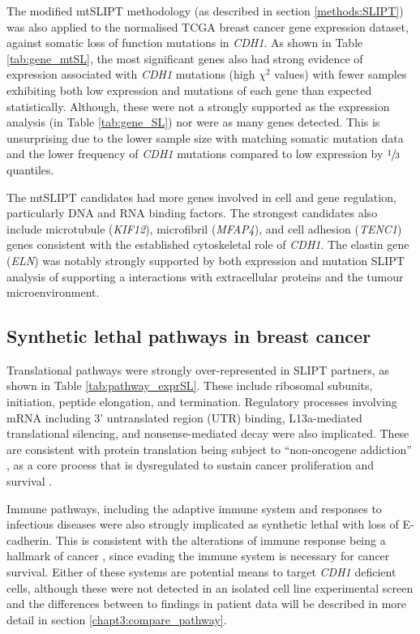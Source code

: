 The modified mtSLIPT methodology (as described in section \ref{methods:SLIPT}) was also applied to the normalised TCGA breast cancer gene expression dataset, against somatic loss of function mutations in \textit{CDH1}. As shown in Table \ref{tab:gene_mtSL}, the most significant genes also had strong evidence of expression associated with \textit{CDH1} mutations (high $\chi^2$ values) with fewer samples exhibiting both low expression and mutations of each gene than expected statistically. Although, these were not a strongly supported as the expression analysis (in Table \ref{tab:gene_SL}) nor were as many genes detected. This is unsurprising due to the lower sample size with matching somatic mutation data and the lower frequency of \textit{CDH1} mutations compared to low expression by $\sfrac{1}{3}$ quantiles.

The mtSLIPT candidates had more genes involved in cell and gene regulation, particularly DNA and RNA binding factors. The strongest candidates also include microtubule (\textit{KIF12}), microfibril (\textit{MFAP4}), and cell adhesion (\textit{TENC1}) genes consistent with the established cytoskeletal role of \textit{CDH1}. The elastin gene (\textit{ELN}) was notably strongly supported by both expression and mutation SLIPT analysis of  supporting a interactions with extracellular proteins and the tumour microenvironment.


\subsection{Synthetic lethal pathways in breast cancer} \label{chapt3:exprSL_pathways}

Translational pathways were strongly over-represented in SLIPT partners, as shown in Table \ref{tab:pathway_exprSL}. These include ribosomal subunits, initiation, peptide elongation, and termination. Regulatory processes involving mRNA including 3' untranslated region (UTR) binding, L13a-mediated translational silencing, and nonsense-mediated decay were also implicated. These are consistent with protein translation being subject to ``non-oncogene addiction'' \citep{Luo2009}, as a core process that is dysregulated to sustain cancer proliferation and survival \citep{Gao2015}.

Immune pathways, including the adaptive immune system and responses to infectious diseases were also strongly implicated as synthetic lethal with loss of E-cadherin. This is consistent with the alterations of immune response being a hallmark of cancer \cite{Hanahan2000}, since evading the immune system is necessary for cancer survival. Either of these systems are potential means to target \textit{CDH1} deficient cells, although these were not detected in an isolated cell line experimental screen \citep{Telford2015} and the differences between to findings in patient data will be described in more detail in section \ref{chapt3:compare_pathway}.

